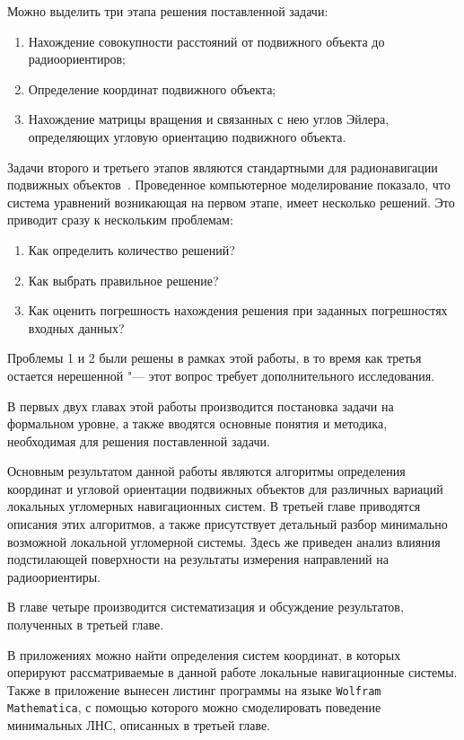 \documentclass[../main.tex]{subfiles}
\begin{document}
Можно выделить три этапа решения поставленной задачи:
\begin{enumerate}
    \item Нахождение совокупности расстояний от подвижного объекта до радиоориентиров;
    \item Определение координат подвижного объекта;
    \item Нахождение матрицы вращения и связанных с нею углов Эйлера, определяющих угловую ориентацию подвижного объекта.
\end{enumerate}
Задачи второго и третьего этапов являются стандартными для радионавигации подвижных объектов~\cite{SOSULIN:1992}. Проведенное компьютерное моделирование показало, что система уравнений возникающая на первом этапе, имеет несколько решений. Это приводит сразу к нескольким проблемам:
\begin{enumerate}
    \item Как определить количество решений? \label{q:1}
    \item Как выбрать правильное решение? \label{q:2}
    \item Как оценить погрешность нахождения решения при заданных погрешностях входных данных? \label{q:3}
\end{enumerate}
Проблемы 1 и 2 были решены в рамках этой работы, в то время как третья остается нерешенной "--- этот вопрос требует дополнительного исследования.

В первых двух главах этой работы производится постановка задачи на формальном уровне, а также вводятся основные понятия и методика, необходимая для решения поставленной задачи.

Основным результатом данной работы являются алгоритмы определения координат и угловой ориентации подвижных объектов для различных вариаций локальных угломерных навигационных систем. В третьей главе приводятся описания этих алгоритмов, а также присутствует детальный разбор минимально возможной локальной угломерной системы. Здесь же приведен анализ влияния подстилающей поверхности на результаты измерения направлений на радиоориентиры.

В главе четыре производится систематизация и обсуждение результатов, полученных в третьей главе.

В приложениях можно найти определения систем координат, в которых оперируют рассматриваемые в данной работе локальные навигационные системы. Также в приложение вынесен листинг программы на языке \texttt{Wolfram Mathematica}, с помощью которого можно смоделировать поведение минимальных ЛНС, описанных в третьей главе.
\end{document}
